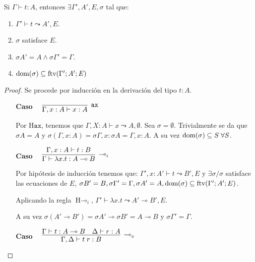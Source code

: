 \begin{teorema}\label{teo:comp_hindley} 
Si $\Gamma \vdash t: A$, entonces $\exists\Gamma',A',E,\sigma$ tal que:
\begin{enumerate}
    \item $\Gamma' \vdash t \leadsto A',E$.
    \item $\sigma$ satisface $E$.
    \item $\sigma A' = A \wedge \sigma \Gamma'=\Gamma$.
    \item $\text{dom}(\sigma) \subseteq \text{ftv}(\Gamma';A';E)$
\end{enumerate}
\end{teorema}
\begin{proof}
Se procede por inducción en la derivación del tipo $t: A$.

\begin{itemize}
     \item[\textbf{Caso}] \(\quad\raisebox{-.35\baselineskip}{\infer[\mathtt{ax}]
     {\Gamma, x : A \vdash x : A}
     {}}\)

Por $\text{H}\mathtt{ax}$, tenemos que $\Gamma, X: A \vdash x\leadsto A, \emptyset$. Sea $\sigma=\emptyset$. Trivialmente se da que $\sigma A = A$ y $\sigma (\Gamma, x:A) = \sigma \Gamma, x:\sigma A = \Gamma, x:A$. A su vez $\text{dom}(\sigma) \subseteq S\;\forall S$.

\vspace{\baselineskip}
     \item[\textbf{Caso}] \(\quad\raisebox{-.35\baselineskip}{\infer[\multimap_i]
         {\Gamma \vdash \lambda x.t : A \multimap B}
         {\Gamma, x : A \vdash t : B}}\)

Por hipótesis de inducción tenemos que: $\Gamma', x: A' \vdash t\leadsto B', E$ y $\exists \sigma / \sigma$ satisface las ecuaciones de $E$, $\sigma B'=B, \sigma \Gamma'=\Gamma,  \sigma A'=A, \text{dom}(\sigma)\subseteq \text{ftv}(\Gamma';A';E)$.

Aplicando la regla $\text{H}\multimap_i$, $\Gamma' \vdash \lambda x.t \leadsto A'\multimap B', E$.

A su vez $\sigma (A'\multimap B') = \sigma A'\multimap \sigma B' = A\multimap B$ y $\sigma \Gamma'=\Gamma$.


\vspace{\baselineskip}
     \item[\textbf{Caso}] \(\quad\raisebox{-.35\baselineskip}{\infer[\multimap_e]
         {\Gamma, \Delta \vdash t\;r : B}
         {\Gamma \vdash t : A \multimap B \quad \Delta \vdash r : A}}\)


\end{itemize}
\end{proof}
